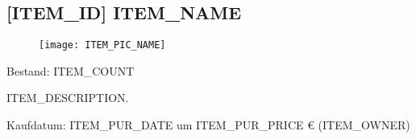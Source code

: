 \documentclass[../list/inventory_full.tex]{subfiles}
\begin{document}

\subsection{[ITEM_ID] ITEM_NAME}

\begin{figure}[h]
  \centering
  \texttt{[image: ITEM\_PIC\_NAME]}
\end{figure}

Bestand: ITEM_COUNT

ITEM_DESCRIPTION.

Kaufdatum: ITEM_PUR_DATE um ITEM_PUR_PRICE € (ITEM_OWNER)

\pagebreak
\end{document}
